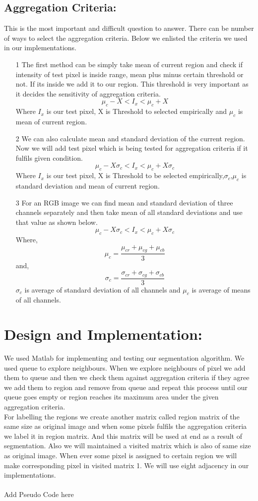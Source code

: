 \documentclass{article}
\begin{document}
\subsection{Aggregation Criteria:}
This is the most important and difficult question to answer. There can be number of ways to select the aggregation criteria. Below we enlisted the criteria we used in our implementations.
\begin{itemize}
  \item[1] The first method can be simply take mean of current region and check if intensity of test pixel is inside range, mean plus minus certain threshold or not. If its inside we add it to our region. This threshold is very important as it decides the sensitivity of aggregation criteria.
  \[ \mu_{c} - X < I_{x} < \mu_{c} + X \]
  Where $ I_{x} $ is our test pixel, X is Threshold to selected empirically and $\mu_{c}$ is mean of current region.
  \item[2] We can also calculate mean and standard deviation of the current region. Now we will add test pixel which is being tested for aggregation criteria if it fulfils given condition.
   \[ \mu_{c} - X\sigma_{c} < I_{x} < \mu_{c} + X\sigma_{c} \]
     Where $ I_{x} $ is our test pixel, X is Threshold to be selected empirically,$\sigma_{c}$,$\mu_{c}$ is standard deviation and mean of current region.
  \item[3] For an RGB image we can find mean and standard deviation of three channels separately and then take mean of all standard deviations and use that value as shown below.
   \[ \mu_{c} - X\sigma_{c} < I_{x} < \mu_{c} + X\sigma_{c} \]
   Where,
   \[\mu_{c} = \frac{\mu_{cr} + \mu_{cg} + \mu_{cb}}{3} \]
   and,
   \[\sigma_{c} = \frac{\sigma_{cr} + \sigma_{cg} + \sigma_{cb}}{3} \]
   $\sigma_{c}$ is average of standard deviation of all channels and $\mu_{c}$ is average of means of all channels.
\end{itemize}
\section{Design and Implementation:}
We used Matlab for implementing and testing our segmentation algorithm. We used queue to explore neighbours. When we explore neighbours of pixel we add them to queue and then we check them against aggregation criteria if they agree we add them to region and remove from queue and repeat this process until our queue goes empty or region reaches its maximum area under the given aggregation criteria.\\
For labelling the regions we create another matrix called region matrix of the same size as original image and when some pixels fulfils the aggregation criteria we label it in region matrix. And this matrix will be used at end as a result of segmentation. Also we will maintained a visited matrix which is also of same size as original image. When ever some pixel is assigned to certain region we will make corresponding pixel in visited matrix 1. We will use eight adjacency in our implementations.\\
\\
Add Pseudo Code here\\
\end{document}
